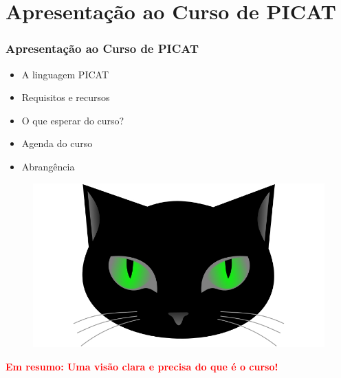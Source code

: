 \section{Apresentação ao Curso de PICAT}


\begin{frame}[fragile]
\frametitle{Apresentação ao Curso de PICAT}
\begin{minipage}{0.47\textwidth}
    \begin{itemize}
        \item A linguagem PICAT   
        \item Requisitos e recursos
        \item O que esperar do curso?
        \item Agenda do curso
        \item Abrangência

    \end{itemize}
\end{minipage}
\begin{minipage}{0.5\textwidth}
\begin{figure}[ht!]
\begin{center}
\includegraphics[width=1.2\textwidth, height=0.40\textheight]{figures/logo_picat_alex.jpg}
\end{center}
\end{figure}
\end{minipage}

\pause
\begin{center}
\textcolor{red}{\textbf{Em resumo: Uma visão clara e precisa do que é o curso!}}
 \end{center}


\end{frame}


